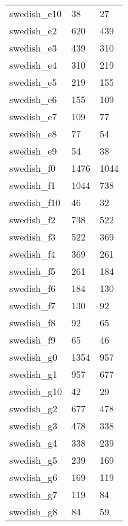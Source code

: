 {\begin{supertabular}{|lll|}
               swedish\_e10 &     38 &     27 \\
                swedish\_e2 &    620 &    439 \\
                swedish\_e3 &    439 &    310 \\
                swedish\_e4 &    310 &    219 \\
                swedish\_e5 &    219 &    155 \\
                swedish\_e6 &    155 &    109 \\
                swedish\_e7 &    109 &     77 \\
                swedish\_e8 &     77 &     54 \\
                swedish\_e9 &     54 &     38 \\
                swedish\_f0 &   1476 &   1044 \\
                swedish\_f1 &   1044 &    738 \\
               swedish\_f10 &     46 &     32 \\
                swedish\_f2 &    738 &    522 \\
                swedish\_f3 &    522 &    369 \\
                swedish\_f4 &    369 &    261 \\
                swedish\_f5 &    261 &    184 \\
                swedish\_f6 &    184 &    130 \\
                swedish\_f7 &    130 &     92 \\
                swedish\_f8 &     92 &     65 \\
                swedish\_f9 &     65 &     46 \\
                swedish\_g0 &   1354 &    957 \\
                swedish\_g1 &    957 &    677 \\
               swedish\_g10 &     42 &     29 \\
                swedish\_g2 &    677 &    478 \\
                swedish\_g3 &    478 &    338 \\
                swedish\_g4 &    338 &    239 \\
                swedish\_g5 &    239 &    169 \\
                swedish\_g6 &    169 &    119 \\
                swedish\_g7 &    119 &     84 \\
                swedish\_g8 &     84 &     59 \\

\end{supertabular}}
